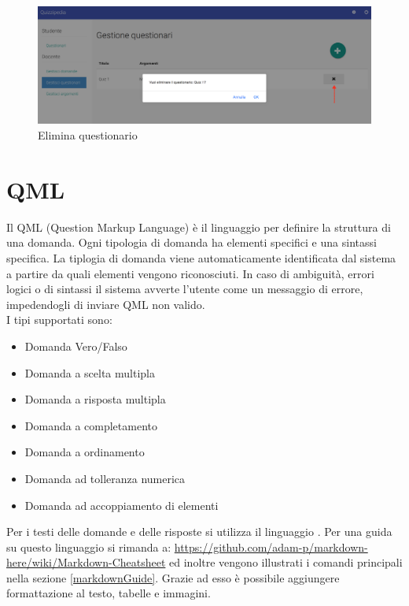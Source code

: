\documentclass[12pt,a4paper]{article}
\begin{document}
		\begin{figure}[H]	
			\centering
			\includegraphics[width=\linewidth]{../img/screenshot/eliminaQuestionario.png}
			\caption{Elimina questionario}
			\label{Elimina questionario}
		\end{figure}
		

	\newpage
	\section{QML}
	\par Il QML (Question Markup Language) è il linguaggio per definire la struttura di una domanda. Ogni tipologia di domanda ha elementi specifici e una sintassi specifica. La tiplogia di domanda viene automaticamente identificata dal sistema a partire da quali elementi vengono riconosciuti. In caso di ambiguità, errori logici o di sintassi il sistema avverte l'utente come un messaggio di errore, impedendogli di inviare QML non valido. \\
		
	 I tipi supportati sono:
	\begin{itemize}
		\item Domanda Vero/Falso
		\item Domanda a scelta multipla
		\item Domanda a risposta multipla
		\item Domanda a completamento
		\item Domanda a ordinamento
		\item Domanda ad tolleranza numerica
		\item Domanda ad accoppiamento di elementi
	\end{itemize}
	Per i testi delle domande e delle risposte si utilizza il linguaggio . Per una guida su questo linguaggio si rimanda a: \url{https://github.com/adam-p/markdown-here/wiki/Markdown-Cheatsheet} ed inoltre vengono illustrati i comandi principali nella sezione \ref{markdownGuide}. Grazie ad esso è possibile aggiungere formattazione al testo, tabelle e immagini.
	 
\end{document}
